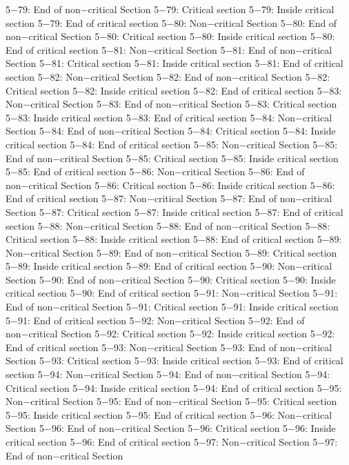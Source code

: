 5−79: End of non−critical Section
5−79: Critical section
5−79: Inside critical section
5−79: End of critical section
5−80: Non−critical Section
5−80: End of non−critical Section
5−80: Critical section
5−80: Inside critical section
5−80: End of critical section
5−81: Non−critical Section
5−81: End of non−critical Section
5−81: Critical section
5−81: Inside critical section
5−81: End of critical section
5−82: Non−critical Section
5−82: End of non−critical Section
5−82: Critical section
5−82: Inside critical section
5−82: End of critical section
5−83: Non−critical Section
5−83: End of non−critical Section
5−83: Critical section
5−83: Inside critical section
5−83: End of critical section
5−84: Non−critical Section
5−84: End of non−critical Section
5−84: Critical section
5−84: Inside critical section
5−84: End of critical section
5−85: Non−critical Section
5−85: End of non−critical Section
5−85: Critical section
5−85: Inside critical section
5−85: End of critical section
5−86: Non−critical Section
5−86: End of non−critical Section
5−86: Critical section
5−86: Inside critical section
5−86: End of critical section
5−87: Non−critical Section
5−87: End of non−critical Section
5−87: Critical section
5−87: Inside critical section
5−87: End of critical section
5−88: Non−critical Section
5−88: End of non−critical Section
5−88: Critical section
5−88: Inside critical section
5−88: End of critical section
5−89: Non−critical Section
5−89: End of non−critical Section
5−89: Critical section
5−89: Inside critical section
5−89: End of critical section
5−90: Non−critical Section
5−90: End of non−critical Section
5−90: Critical section
5−90: Inside critical section
5−90: End of critical section
5−91: Non−critical Section
5−91: End of non−critical Section
5−91: Critical section
5−91: Inside critical section
5−91: End of critical section
5−92: Non−critical Section
5−92: End of non−critical Section
5−92: Critical section
5−92: Inside critical section
5−92: End of critical section
5−93: Non−critical Section
5−93: End of non−critical Section
5−93: Critical section
5−93: Inside critical section
5−93: End of critical section
5−94: Non−critical Section
5−94: End of non−critical Section
5−94: Critical section
5−94: Inside critical section
5−94: End of critical section
5−95: Non−critical Section
5−95: End of non−critical Section
5−95: Critical section
5−95: Inside critical section
5−95: End of critical section
5−96: Non−critical Section
5−96: End of non−critical Section
5−96: Critical section
5−96: Inside critical section
5−96: End of critical section
5−97: Non−critical Section
5−97: End of non−critical Section
